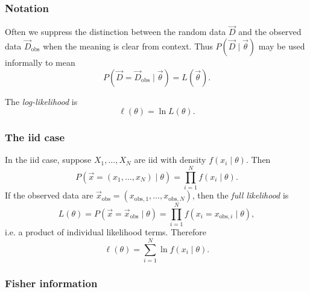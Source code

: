 \documentclass[11pt, titlepage]{article} %
\numberwithin{equation}{section}
\theoremstyle{definition}
\numberwithin{assumption}{section}
\begin{document}
\subsubsection*{Notation}

Often we suppress the distinction between the random data $\vec D$ and the observed data $\vec D_{\mathrm{obs}}$ when the meaning is clear from context. Thus $P(\vec D\mid \vec\theta)$ may be used informally to mean
\begin{equation*}
    P(\vec D=\vec D_{\mathrm{obs}}\mid \vec\theta)=L(\vec\theta).
\end{equation*}

The \textit{log-likelihood} is
\begin{equation*}
    \ell(\theta)=\ln L(\theta).
\end{equation*}

\subsubsection*{The iid case}
In the iid case, suppose $X_1,\dots,X_N$ are iid with density $f(x_i\mid \theta)$. Then
\begin{equation*}
    P(\vec x=(x_1,\dots,x_N)\mid \theta)=\prod_{i=1}^N f(x_i\mid \theta).
\end{equation*}
If the observed data are $\vec x_{\mathrm{obs}}=(x_{\mathrm{obs},1},\dots,x_{\mathrm{obs},N})$, then the \textit{full likelihood} is
\begin{equation*}
    L(\theta)=P(\vec x=\vec x_{\mathrm{obs}}\mid \theta)
    =\prod_{i=1}^N f(x_i=x_{\mathrm{obs},i}\mid \theta),
\end{equation*}
i.e. a product of individual likelihood terms. Therefore
\begin{equation*}
    \ell(\theta)=\sum_{i=1}^N \ln f(x_i\mid \theta).
\end{equation*}


\subsubsection*{Fisher information}
\end{document}
